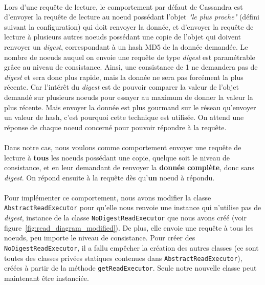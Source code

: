 \documentclass[12pt]{article}
\newcommand{\class}[1]{\texttt{#1}}
\begin{document}
\paragraph{}Lors d'une requête de lecture, le comportement par défaut de Cassandra est d'envoyer la requête de lecture au noeud possédant l'objet \textit{"le plus proche"} (défini suivant la configuration) qui doit renvoyer la donnée, et d'envoyer la requête de lecture à plusieurs autres noeuds possédant une copie de l'objet qui doivent renvoyer un \textit{digest}, correspondant à un hash MD5 de la donnée demandée. Le nombre de noeuds auquel on envoie une requête de type \textit{digest} est paramétrable grâce au niveau de consistance. Ainsi, une consistance de 1 ne demandera pas de \textit{digest} et sera donc plus rapide, mais la donnée ne sera pas forcément la plus récente. Car l'intérêt du \textit{digest} est de pouvoir comparer la valeur de l'objet demandé sur plusieurs noeuds pour essayer au maximum de donner la valeur la plus récente. Mais envoyer la donnée est plus gourmand sur le réseau qu'envoyer un valeur de hash, c'est pourquoi cette technique est utilisée. On attend une réponse de chaque noeud concerné pour pouvoir répondre à la requête.

\paragraph{}Dans notre cas, nous voulons comme comportement envoyer une requête de lecture à \textbf{tous} les noeuds possédant une copie, quelque soit le niveau de consistance, et en leur demandant de renvoyer la \textbf{donnée complète}, donc sans \textit{digest}. On répond ensuite à la requête dès qu'\textbf{un} noeud à répondu.

\paragraph{}Pour implémenter ce comportement, nous avons modifier la classe \class{AbstractReadExecutor} pour qu'elle nous renvoie une instance qui n'utilise pas de \textit{digest}, instance de la classe \class{NoDigestReadExecutor} que nous avons créé (voir figure~\ref{fig:read_diagram_modified}). De plus, elle envoie une requête à tous les noeuds, peu importe le niveau de consistance. Pour créer des \class{NoDigestReadExecutor}, il a fallu empêcher la création des autres classes (ce sont toutes des classes privées statiques contenues dans \class{AbstractReadExecutor}), créées à partir de la méthode \texttt{getReadExecutor}. Seule notre nouvelle classe peut maintenant être instanciée.
\end{document}
